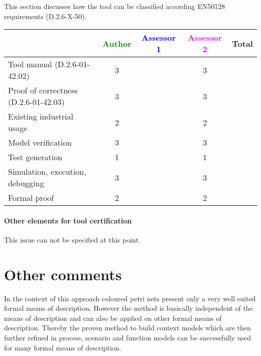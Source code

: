 This section discusses how the tool can be classified according EN50128 requirements (D.2.6-X-50).


\begin{tabular}{|l | c | c | c | c|}
\hline
& \textcolor{green}{Author} & \textcolor{blue}{Assessor 1} & \textcolor{magenta}{Assessor 2} & Total \\
\hline 
Tool manual (D.2.6-01-42.02) & 3 & & 3 &  \\
\hline
Proof of correctness (D.2.6-01-42.03)   & 3  & & 3 & \\
\hline
Existing industrial  usage  & 2 & & 2 & \\
\hline
Model verification & 3 & & 3 & \\
\hline
Test generation & 1 & & 1 & \\
\hline
Simulation, execution, debugging & 3 & & 3 & \\
\hline
Formal proof & 2 & & 2 & \\
\hline
\end{tabular}


\paragraph{Other elements for tool certification}
This issue can not be specified at this point.


\section{Other comments}
In the context of this approach coloured petri nets present only a very well suited formal means of description. However the method is basically independent of the means of description and can also be applied on other formal means of description. Thereby the proven method to build context models which are then further refined in process, scenario and function models can be successfully used for many formal means of description. 



